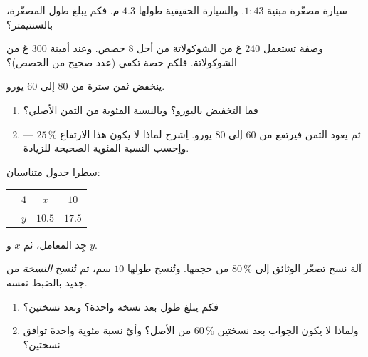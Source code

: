 \begin{exercise}[$\star$]\label{exo:g7:prop:7}
سيارة مصغّرة مبنية  $1 : 43$. والسيارة الحقيقية طولها $4.3$ م.
فكم يبلغ طول المصغّرة، بالسنتيمتر؟
\end{exercise}

\begin{exercise}[$\star\star$]\label{exo:g7:prop:8}
وصفة تستعمل $240$ غ من الشوكولاتة من أجل $8$ حصص. وعند أمينة
$300$ غ من الشوكولاتة. فلكم حصة تكفي (عدد صحيح
من الحصص)؟
\end{exercise}

\begin{exercise}[$\star\star$]\label{exo:g7:prop:9}
ينخفض ثمن سترة من $80$ إلى $60$ يورو.
\begin{enumerate}
  \item فما التخفيض باليورو؟ وبالنسبة المئوية من الثمن
        الأصلي؟
  \item ثم يعود الثمن فيرتفع من $60$ إلى $80$ يورو. اِشرح
        لماذا لا يكون هذا الارتفاع $25\,\%$ --- واِحسب النسبة
        المئوية الصحيحة للزيادة.
\end{enumerate}
\end{exercise}

\begin{exercise}[$\star\star$]\label{exo:g7:prop:10}
سطرا جدول متناسبان:
\begin{center}
\renewcommand{\arraystretch}{1.2}
\begin{tabular}{l|ccc}
 & $4$ & $x$ & $10$ \\
\hline
 & $y$ & $10.5$ & $17.5$ \\
\end{tabular}
\end{center}
جِد المعامل، ثم $x$ و $y$.
\end{exercise}

\begin{exercise}[$\star\star\star$]\label{exo:g7:prop:11}
آلة نسخ تصغّر الوثائق إلى $80\,\%$ من حجمها. وتُنسخ 
طولها $10$ سم، ثم تُنسخ \emph{النسخة} من جديد بالضبط
نفسه.
\begin{enumerate}
  \item فكم يبلغ طول  بعد نسخة واحدة؟ وبعد نسختين؟
  \item ولماذا لا يكون الجواب بعد نسختين $60\,\%$ من
        الأصل؟ وأيّ نسبة مئوية واحدة توافق نسختين؟
\end{enumerate}
\end{exercise}

